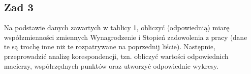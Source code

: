 \documentclass[12pt]{mwart}\usepackage[]{graphicx}\usepackage[]{color}
\begin{document}
\subsection*{Zad 3}
Na podstawie danych zawartych w tablicy 1, obliczyć (odpowiednią) miarę współzmienności zmiennych Wynagrodzenie i Stopień zadowolenia z pracy (dane te są trochę inne niż te rozpatrywane na poprzednij liście). Następnie, przeprowadzić analizę korespondencji, tzn. obliczyć wartości odpowiednich macierzy, współrzędnych punktów oraz utworzyć odpowiednie wykresy.
\end{document}
